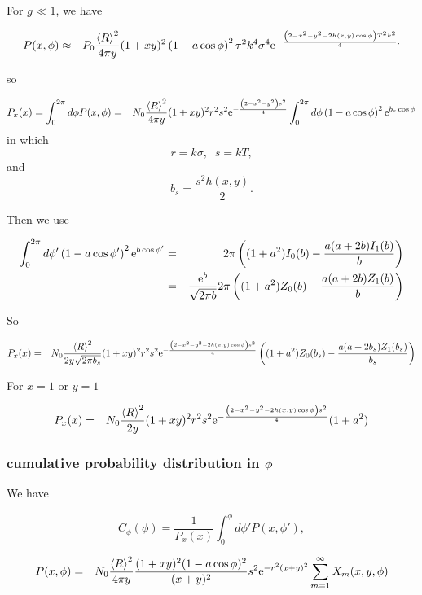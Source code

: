 \documentclass[11pt]{article}
\newcommand{\e}{{\rm e}}
\begin{document}
{{{{For $g\ll 1$, we have

\begin{eqnarray}
P(x,\phi)
&\approx&P_{0}\frac{\left<R\right>^{2}}{4\pi y}(1+xy)^{2}\left(1-a\cos\phi\right)^{2}\tau^{2}k^{4}\sigma^{4}\e^{-\frac{\left(2-x^{2}-y^{2}-2h(x,y)\cos\phi\right)T^{2}k^{2}}{4}.}
\end{eqnarray}

so

\begin{eqnarray}
P_{x}(x)=\int_{0}^{2\pi}d\phi P(x,\phi)&=& N_{0}\frac{\left<R\right>^{2}}{4\pi y}(1+xy)^{2}r^{2}s^{2}\e^{-\frac{\left(2-x^{2}-y^{2}\right)s^{2}}{4}}
\int_{0}^{2\pi}d\phi\left(1-a\cos\phi\right)^{2}\e^{b_{s}\cos\phi}
\end{eqnarray}
in which
$$r=k\sigma,\;\;s=kT,$$
and
$$b_{s}=\frac{s^{2}h(x,y)}{2}.$$

Then we use

\begin{eqnarray}
\int_{0}^{2\pi}d\phi'\left(1-a\cos\phi' \right)^{2}\e^{b\cos\phi'}&=&
2\pi\left((1+a^{2})I_{0}(b)-\frac{a(a+2b)I_{1}(b)}{b}\right)\\
&=&\frac{\e^{b}}{\sqrt{2\pi b}}2\pi\left((1+a^{2})Z_{0}(b)-\frac{a(a+2b)Z_{1}(b)}{b}\right)
\end{eqnarray}

So

\begin{eqnarray}
P_{x}(x)&=& N_{0}\frac{\left<R\right>^{2}}{2 y\sqrt{2\pi b_{s}}}(1+xy)^{2}r^{2}s^{2}\e^{-\frac{\left(2-x^{2}-y^{2}-2h(x,y)\cos\phi\right)s^{2}}{4}}
\left((1+a^{2})Z_{0}(b_{s})-\frac{a(a+2b_{s})Z_{1}(b_{s})}{b_{s}}\right)
\end{eqnarray}

For $x=1$ or $y=1$

\begin{eqnarray}
P_{x}(x)&=& N_{0}\frac{\left<R\right>^{2}}{2 y}(1+xy)^{2}r^{2}s^{2}\e^{-\frac{\left(2-x^{2}-y^{2}-2h(x,y)\cos\phi\right)s^{2}}{4}}
(1+a^{2})
\end{eqnarray}

\subsubsection{cumulative probability distribution in $\phi$}
We have

$$C_{\phi}(\phi)=\frac{1}{P_x(x)}\int_{0}^{\phi}d\phi'P(x,\phi'),$$

\begin{eqnarray}
P(x,\phi)&=&
 N_{0}\frac{\left<R\right>^{2}}{4\pi y}\frac{(1+xy)^{2}(1-a\cos\phi)^{2}}{(x+y)^{2}}s^{2}\e^{-r^{2}(x+y)^{2}}\sum_{m=1}^{\infty}X_{m}(x,y,\phi)
\end{eqnarray}

}}}}
\end{document}
